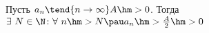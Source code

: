 \label{A2}
Пусть $a_n\tend{n\to\infty}A\hm>0$. Тогда $\exists\  N\in\N\colon \forall\  n\hm>N\pau a_n\hm>\frac A2\hm>0$
